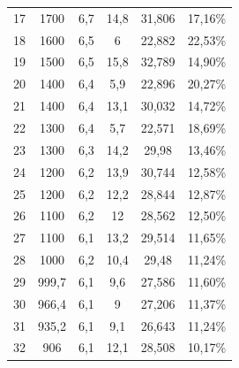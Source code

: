 \begin{longtable}{cccccc}
  17          & 1700                 & 6,7           & 14,8           & 31,806        & 17,16\%                            \\
  18          & 1600                 & 6,5           & 6              & 22,882        & 22,53\%                            \\
  19          & 1500                 & 6,5           & 15,8           & 32,789        & 14,90\%                            \\
  20          & 1400                 & 6,4           & 5,9            & 22,896        & 20,27\%                            \\
  21          & 1400                 & 6,4           & 13,1           & 30,032        & 14,72\%                            \\
  22          & 1300                 & 6,4           & 5,7            & 22,571        & 18,69\%                            \\
  23          & 1300                 & 6,3           & 14,2           & 29,98         & 13,46\%                            \\
  24          & 1200                 & 6,2           & 13,9           & 30,744        & 12,58\%                            \\
  25          & 1200                 & 6,2           & 12,2           & 28,844        & 12,87\%                            \\
  26          & 1100                 & 6,2           & 12             & 28,562        & 12,50\%                            \\
  27          & 1100                 & 6,1           & 13,2           & 29,514        & 11,65\%                            \\
  28          & 1000                 & 6,2           & 10,4           & 29,48         & 11,24\%                            \\
  29          & 999,7                & 6,1           & 9,6            & 27,586        & 11,60\%                            \\
  30          & 966,4                & 6,1           & 9              & 27,206        & 11,37\%                            \\
  31          & 935,2                & 6,1           & 9,1            & 26,643        & 11,24\%                            \\
  32          & 906                  & 6,1           & 12,1           & 28,508        & 10,17\%                            \\

\end{longtable}
